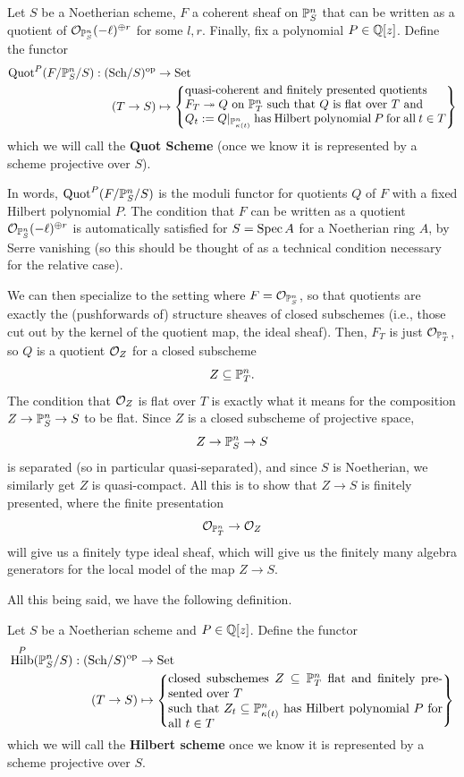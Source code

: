\documentclass[12pt]{article}
\DeclareMathOperator{\Hilb}{Hilb}
\begin{document}
\begin{defn}
    Let $S$ be a Noetherian scheme, $F$ a coherent sheaf on $\P_S^n$ that can be written as a quotient of $\cO_{\P^n_S}(-\ell)^{\oplus r}$ for some $l,r$. Finally, fix a polynomial $P\in \Q[z]$. Define the functor
    \begin{align*}
        \Quot^P(F/\P_S^n/S): (\Sch/S)^\op &\to \Set\\
        (T\to S) &\mapsto \left\{\parbox{22em}{quasi-coherent and finitely presented quotients\\ $F_T\twoheadrightarrow Q$ on $\P_T^n$ such that $Q$ is flat over $T$ and\\ $Q_t\defeq Q|_{\P^n_{\kappa(t)}}$ has Hilbert polynomial $P$ for all $t\in T$}\right\}
    \end{align*}
    which we will call the \textbf{Quot Scheme} (once we know it is represented by a scheme projective over $S$).
\end{defn}

In words, $\Quot^P(F/\P_S^n/S)$ is the moduli functor for quotients $Q$ of $F$ with a fixed Hilbert polynomial $P$. The condition that $F$ can be written as a quotient $\cO_{\P_S^n}(-\ell)^{\oplus r}$ is automatically satisfied for $S=\Spec A$ for a Noetherian ring $A$, by Serre vanishing (so this should be thought of as a technical condition necessary for the relative case).

We can then specialize to the setting where $F=\cO_{\P_S^n}$, so that quotients are exactly the (pushforwards of) structure sheaves of closed subschemes (i.e., those cut out by the kernel of the quotient map, the ideal sheaf). Then, $F_T$ is just $\cO_{\P^n_T}$, so $Q$ is a quotient $\cO_Z$ for a closed subscheme
\[Z\subseteq \P_T^n.\]
The condition that $\cO_Z$ is flat over $T$ is exactly what it means for the composition $Z\to \P_S^n \to S$ to be flat. Since $Z$ is a closed subscheme of projective space,
\[Z \to \P_S^n \to S\]
is separated (so in particular quasi-separated), and since $S$ is Noetherian, we similarly get $Z$ is quasi-compact. All this is to show that $Z\to S$ is finitely presented, where the finite presentation
\[\cO_{\P_T^n} \to \cO_Z\]
will give us a finitely type ideal sheaf, which will give us the finitely many algebra generators for the local model of the map $Z\to S$.

All this being said, we have the following definition.

\begin{defn}
    Let $S$ be a Noetherian scheme and $P\in \Q[z]$. Define the functor
    \begin{align*}
        \Hilb^P(\P_S^n/S): (\Sch/S)^\op &\to \Set\\
        (T\to S) &\mapsto \left\{\parbox{22em}{closed subschemes $Z\subseteq \P_T^n$ flat and finitely presented over $T$\\ such that $Z_t\subseteq \P_{\kappa(t)}^n$ has Hilbert polynomial $P$ for all $t\in T$}\right\}
    \end{align*}
    which we will call the \textbf{Hilbert scheme} once we know it is represented by a scheme projective over $S$.
\end{defn}
\end{document}
